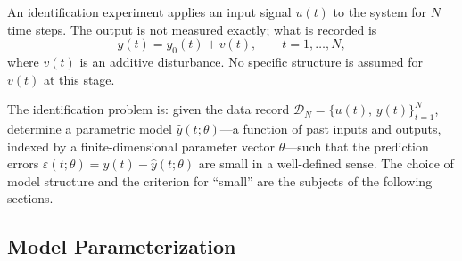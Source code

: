\documentclass{ifacconf}
\begin{document}
An identification experiment applies an input signal $u(t)$ to the system for
$N$ time steps.  The output is not measured exactly; what is recorded is
\begin{equation}
    y(t) = y_0(t) + v(t), \qquad t = 1, \ldots, N,
    \label{eq:noisy-output}
\end{equation}
where $v(t)$ is an additive disturbance.  No specific structure is assumed for
$v(t)$ at this stage.

The identification problem is: given the data record
$\mathcal{D}_N = \{u(t),\,y(t)\}_{t=1}^{N}$, determine a parametric model
$\hat{y}(t;\theta)$---a function of past inputs and outputs, indexed by a
finite-dimensional parameter vector $\theta$---such that the prediction errors
$\varepsilon(t;\theta) = y(t) - \hat{y}(t;\theta)$ are small in a well-defined
sense.  The choice of model structure and the criterion for ``small'' are the
subjects of the following sections.

\subsection{Model Parameterization}
\label{subsec:model-structures}
\end{document}
